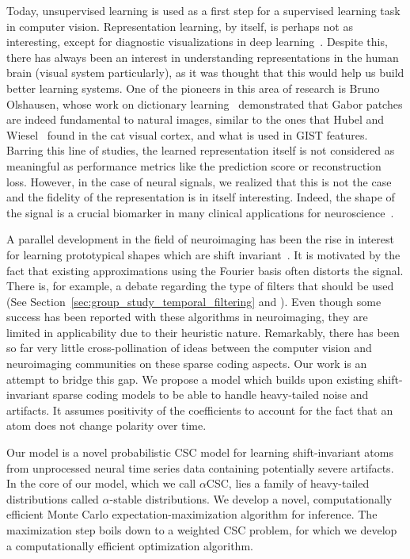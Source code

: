 Today, unsupervised learning is used as a first step for a supervised learning task in computer vision. Representation learning, by itself, is perhaps not as interesting, except for diagnostic visualizations in deep learning~\citep{zeiler2014visualizing}. Despite this, there has always been an interest in understanding representations in the human brain (visual system particularly), as it was thought that this would help us build better learning systems. One of the pioneers in this area of research is Bruno Olshausen, whose work on dictionary learning~\citep{olshausen1996emergence} demonstrated that Gabor patches are indeed fundamental to natural images, similar to the ones that Hubel and Wiesel~\citep{hubel1962receptive, marcelja1980mathematical} found in the cat visual cortex, and what is used in GIST features. Barring this line of studies, the learned representation itself is not considered as meaningful as performance metrics like the prediction score or reconstruction loss. However, in the case of neural signals, we realized that this is not the case and the fidelity of the representation is in itself interesting. Indeed, the shape of the signal is a crucial biomarker in many clinical applications for neuroscience~\citep{cole2017brain}. 

A parallel development in the field of neuroimaging has been the rise in interest for learning prototypical shapes which are shift invariant~\citep{jost2006motif, barthelemy2013multivariate, brockmeier2016learning, hitziger2017adaptive}. It is motivated by the fact that existing approximations using the Fourier basis often distorts the signal. There is, for example, a debate regarding the type of filters that should be used (See Section~\ref{sec:group_study_temporal_filtering} and \cite{widmann2015digital,parks1987digital,ifeachor2002digital, gotz-etal:15}). 
Even though some success has been reported
with these algorithms in neuroimaging, they are limited in applicability due to their heuristic nature.
Remarkably, there has been so far very little cross-pollination of ideas between the computer vision and neuroimaging communities on these sparse coding aspects. 
Our work is an attempt to bridge this gap. 
We propose a model which builds upon existing shift-invariant sparse coding models to be able to handle heavy-tailed noise and artifacts. It assumes positivity of the coefficients to account for the fact that an atom does not change polarity over time. 

Our model is a novel probabilistic \ac{CSC} model for learning shift-invariant atoms from unprocessed neural time series data containing
potentially severe artifacts.
In the core of our model, which we call $\alpha$CSC, lies a family of heavy-tailed
distributions called $\alpha$-stable distributions. We develop a novel, computationally efficient Monte Carlo
expectation-maximization algorithm for inference. The maximization step boils down to a weighted
\ac{CSC} problem, for which we develop a computationally efficient optimization algorithm.

